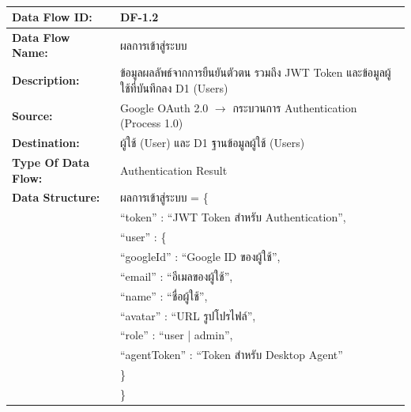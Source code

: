 \begin{table}[H]
    \caption{}
    \label{tab:df-1-2}
    \fontSixTeen 
    \begin{tabularx}{\textwidth}{|l|L|} 
        \hline
        \textbf{Data Flow ID:} & DF-1.2 \\
        \hline
        \textbf{Data Flow Name:} & ผลการเข้าสู่ระบบ \\
        \hline
        \textbf{Description:} & ข้อมูลผลลัพธ์จากการยืนยันตัวตน รวมถึง JWT Token และข้อมูลผู้ใช้ที่บันทึกลง D1 (Users) \\
        \hline
        \textbf{Source:} & Google OAuth 2.0 $\rightarrow$ กระบวนการ Authentication (Process 1.0) \\
        \hline
        \textbf{Destination:} & ผู้ใช้ (User) และ D1 ฐานข้อมูลผู้ใช้ (Users) \\
        \hline
        \textbf{Type Of Data Flow:} & Authentication Result \\
        \hline
        \textbf{Data Structure:} & ผลการเข้าสู่ระบบ = \{ \nonumber \\
                        & \hspace{1em} ``token'' : ``JWT Token สำหรับ Authentication'', \nonumber \\
                        & \hspace{1em} ``user'' : \{ \nonumber \\
                        & \hspace{2em} ``googleId'' : ``Google ID ของผู้ใช้'', \nonumber \\
                        & \hspace{2em} ``email'' : ``อีเมลของผู้ใช้'', \nonumber \\
                        & \hspace{2em} ``name'' : ``ชื่อผู้ใช้'', \nonumber \\
                        & \hspace{2em} ``avatar'' : ``URL รูปโปรไฟล์'', \nonumber \\
                        & \hspace{2em} ``role'' : ``user | admin'', \nonumber \\
                        & \hspace{2em} ``agentToken'' : ``Token สำหรับ Desktop Agent'' \nonumber \\
                        & \hspace{1em} \} \nonumber \\
                        & \} \\
        \hline
    \end{tabularx}
\end{table}

